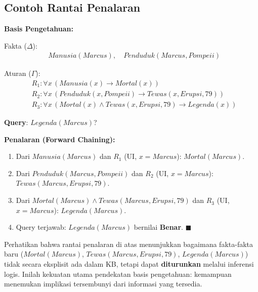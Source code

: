 \subsection{Contoh Rantai Penalaran}

\begin{contoh}
\textbf{Basis Pengetahuan:}

Fakta ($\Delta$):
\begin{align*}
&Manusia(Marcus), \quad Penduduk(Marcus, Pompeii)
\end{align*}

Aturan ($\Gamma$):
\begin{align*}
&R_1: \forall x\, (Manusia(x) \rightarrow Mortal(x)) \\
&R_2: \forall x\, (Penduduk(x, Pompeii) \rightarrow Tewas(x, Erupsi, 79)) \\
&R_3: \forall x\, (Mortal(x) \wedge Tewas(x, Erupsi, 79) \rightarrow Legenda(x))
\end{align*}

\textbf{Query}: $Legenda(Marcus)$?

\textbf{Penalaran (Forward Chaining):}
\begin{enumerate}
    \item Dari $Manusia(Marcus)$ dan $R_1$ (UI, $x = Marcus$): $Mortal(Marcus)$.
    \item Dari $Penduduk(Marcus, Pompeii)$ dan $R_2$ (UI, $x = Marcus$): $Tewas(Marcus, Erupsi, 79)$.
    \item Dari $Mortal(Marcus) \wedge Tewas(Marcus, Erupsi, 79)$ dan $R_3$ (UI, $x = Marcus$): $Legenda(Marcus)$.
    \item Query terjawab: $Legenda(Marcus)$ bernilai \textbf{Benar}. $\blacksquare$
\end{enumerate}
\end{contoh}

\begin{konsep}
Perhatikan bahwa rantai penalaran di atas menunjukkan bagaimana fakta-fakta baru ($Mortal(Marcus)$, $Tewas(Marcus, Erupsi, 79)$, $Legenda(Marcus)$) tidak secara eksplisit ada dalam KB, tetapi dapat \textbf{diturunkan} melalui inferensi logis. Inilah kekuatan utama pendekatan basis pengetahuan: kemampuan menemukan implikasi tersembunyi dari informasi yang tersedia.
\end{konsep}
